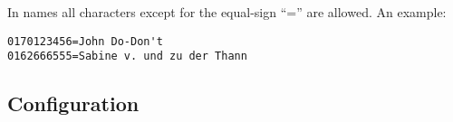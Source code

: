 In names all characters except for the equal-sign ``='' are allowed.
An example:

\begin{small}
\begin{example}
\begin{verbatim}
0170123456=John Do-Don't
0162666555=Sabine v. und zu der Thann
\end{verbatim}
\end{example}
\end{small}


\subsection {Configuration}

